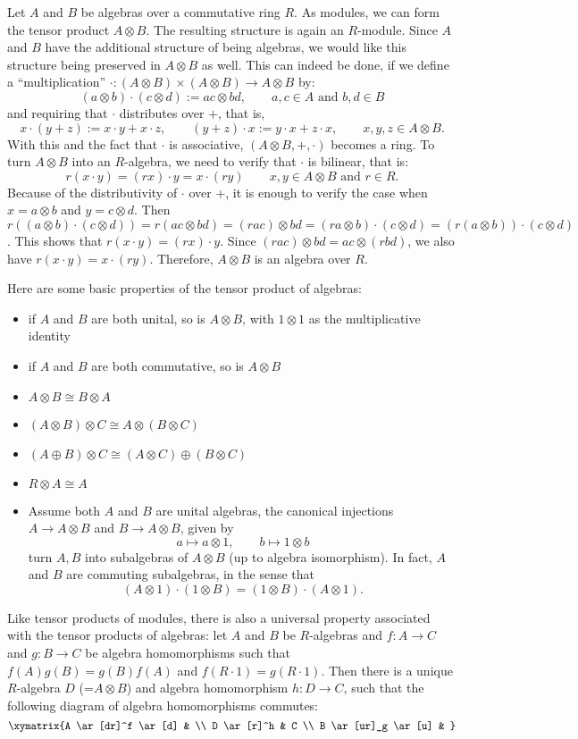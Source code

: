 \documentclass[12pt]{article}
\begin{document}
Let $A$ and $B$ be algebras over a commutative ring $R$.  As modules, we can form the tensor product $A\otimes B$.  The resulting structure is again an $R$-module.  Since $A$ and $B$ have the additional structure of being algebras, we would like this structure being preserved in $A\otimes B$ as well.  This can indeed be done, if we define a ``multiplication'' $\cdot: (A\otimes B)\times (A\otimes B)\to A\otimes B$ by:
$$(a\otimes b)\cdot (c\otimes d):=ac\otimes bd, \qquad a,c\in A\mbox{ and }b,d\in B$$
and requiring that $\cdot$ distributes over $+$, that is, $$x\cdot (y+z):=x\cdot y+x\cdot z,\qquad(y+z)\cdot x:=y\cdot x+z\cdot x, \qquad x,y,z\in A\otimes B.$$  With this and the fact that $\cdot$ is associative, $(A\otimes B, +, \cdot)$ becomes a ring.  To turn $A\otimes B$ into an $R$-algebra, we need to verify that $\cdot$ is bilinear, that is:
$$r(x\cdot y)=(rx)\cdot y = x\cdot (ry)\qquad x,y\in A\otimes B\mbox{ and }r\in R.$$
Because of the distributivity of $\cdot$ over $+$, it is enough to verify the case when $x=a\otimes b$ and $y=c\otimes d$.  Then $r((a\otimes b)\cdot (c\otimes d))=r(ac\otimes bd)= (rac)\otimes bd = (ra\otimes b)\cdot (c\otimes d)=(r(a\otimes b))\cdot (c\otimes d)$.  This shows that $r(x\cdot y)=(rx)\cdot y$.  Since $(rac)\otimes bd = ac\otimes (rbd)$, we also have $r(x\cdot y)=x\cdot (ry)$.  Therefore, $A\otimes B$ is an algebra over $R$.

Here are some basic properties of the tensor product of algebras:
\begin{itemize}
\item if $A$ and $B$ are both unital, so is $A\otimes B$, with $1\otimes 1$ as the multiplicative identity
\item if $A$ and $B$ are both commutative, so is $A\otimes B$
\item $A\otimes B\cong B\otimes A$
\item $(A\otimes B)\otimes C\cong A\otimes (B\otimes C)$
\item $(A\oplus B)\otimes C\cong (A\otimes C) \oplus (B\otimes C)$
\item $R\otimes A\cong A$
\item Assume both $A$ and $B$ are unital algebras, the canonical injections $A\to A\otimes B$ and $B\to A\otimes B$, given by $$a\mapsto a\otimes 1,\qquad b\mapsto 1\otimes b$$ turn $A,B$ into subalgebras of $A\otimes B$ (up to algebra isomorphism).  In fact, $A$ and $B$ are commuting subalgebras, in the sense that $$(A\otimes 1)\cdot (1\otimes B)=(1\otimes B)\cdot (A\otimes 1).$$
\end{itemize}

Like tensor products of modules, there is also a universal property associated with the tensor products of algebras: let $A$ and $B$ be $R$-algebras and $f:A\to C$ and $g:B\to C$ be algebra homomorphisms such that $f(A)g(B)=g(B)f(A)$ and $f(R\cdot 1)=g(R\cdot 1)$.  Then there is a unique $R$-algebra $D$ (=$A\otimes B$) and algebra homomorphism $h: D\to C$, such that the following diagram of algebra homomorphisms commutes:
$$
\xymatrix{A \ar[dr]^f \ar[d] & \\ D \ar[r]^h & C \\ B \ar[ur]_g \ar[u] & }
$$
\end{document}
